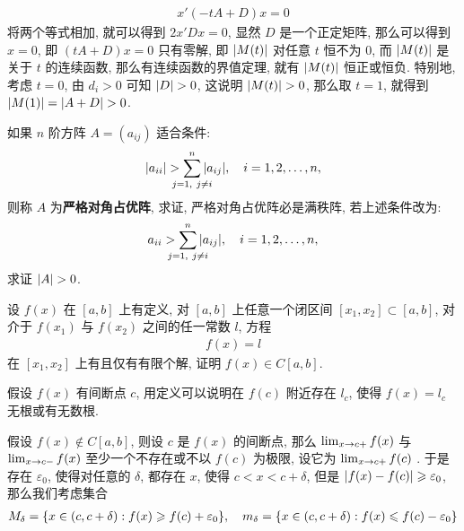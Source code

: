 \documentclass{ctexart}
\begin{document}
\begin{exercise}[series=exer]
\begin{answer}
\begin{align*}
            x'(-tA + D)x = 0
        \end{align*}
        将两个等式相加, 就可以得到 $ 2x'Dx = 0 $, 显然 $ D $ 是一个正定矩阵, 那么可以得到 $ x = 0 $, 即 $ (tA + D)x = 0 $ 只有零解, 即 $ \abs{M(t)} $ 对任意 $ t $ 恒不为 $ 0 $, 而 $ \abs{M(t)} $ 是关于 $ t $ 的连续函数, 那么有连续函数的界值定理, 就有 $ \abs{M(t)} $ 恒正或恒负. 特别地, 考虑 $ t = 0 $, 由 $ d_{i} > 0 $ 可知 $ \abs{D} > 0 $, 这说明 $ \abs{M(t)} > 0 $, 那么取 $ t = 1 $, 就得到 $ \abs{M(1)} = \abs{A + D} > 0 $. 
    \end{answer}
    \item 如果 $ n $ 阶方阵 $ A = (a_{ij}) $ 适合条件:
    \begin{align*}
        \abs{a_{ii}} > \sum_{\mathclap{j = 1,\ j \ne i}}^{n} \abs{a_{ij}}, \quad i = 1, 2, \dots, n,
    \end{align*}
    则称 $ A $ 为\textbf{严格对角占优阵}, 求证, 严格对角占优阵必是满秩阵, 若上述条件改为:
    \begin{align*}
        a_{ii} > \sum_{\mathclap{j = 1,\ j \ne i}}^{n} \abs{a_{ij}}, \quad i = 1, 2, \dots, n,
    \end{align*}   
    求证 $ \abs{A} > 0 $. 
    \item 设 $ f(x) $ 在 $ [a, b] $ 上有定义, 对 $ [a, b] $ 上任意一个闭区间 $ [x_{1}, x_{2}] \subset [a, b] $, 对介于 $ f(x_{1}) $ 与 $ f(x_{2}) $ 之间的任一常数 $ l $, 方程 
    \begin{align*}
        f(x) = l
    \end{align*}
    在 $ [x_{1}, x_{2}] $ 上有且仅有有限个解, 证明 $ f(x) \in C[a, b] $.
    \begin{hint}
        假设 $ f(x) $ 有间断点 $ c $, 用定义可以说明在 $ f(c) $ 附近存在 $ l_{c} $, 使得 $ f(x) = l_{c} $ 无根或有无数根.
    \end{hint}
    \begin{answer}
        假设 $ f(x) \notin C[a, b] $, 则设 $ c $ 是 $ f(x) $ 的间断点, 那么 $ \lim_{x \to c+}f(x) $ 与 $ \lim_{x \to c-} f(x) $ 至少一个不存在或不以 $ f(c) $ 为极限, 设它为 $ \lim_{x \to c+}f(c) $ . 于是存在 $ \varepsilon_{0} $, 使得对任意的 $ \delta $, 都存在 $ x $, 使得 $ c < x < c + \delta $, 但是 $ \abs{f(x) - f(c)} \geqslant \varepsilon_{0} $, 那么我们考虑集合
        \begin{align*}
            M_{\delta} = \qty{x \in (c, c+\delta) : f(x) \geqslant f(c) + \varepsilon_{0}}, \quad m_{\delta} = \qty{x \in (c, c+\delta) : f(x) \leqslant f(c) - \varepsilon_{0}}
        \end{align*}

\end{answer}
\end{exercise}
\end{document}

